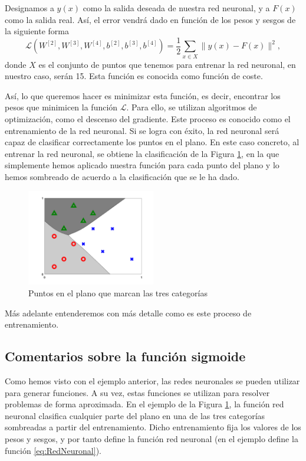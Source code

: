 \documentclass[a4paper,11pt,spanish, twoside, leqno]{tfg-uam}
\theoremstyle{definition}
\begin{document}
Designamos a $y(x)$ como la salida deseada de nuestra red neuronal, y a $F(x)$ como la salida real. Así, el error vendrá dado en función de los pesos y sesgos de la siguiente forma
\begin{equation*}
    \mathcal{L}(W^{[2]},W^{[3]},W^{[4]},b^{[2]},b^{[3]},b^{[4]})=\frac{1}{2}\sum_{x\in X}\|y(x)-F(x)\|^2,
\end{equation*}
donde $X$ es el conjunto de puntos que tenemos para entrenar la red neuronal, en nuestro caso, serán 15. Esta función es conocida como función de coste.

Así, lo que queremos hacer es minimizar esta función, es decir, encontrar los pesos que minimicen la función $\mathcal{L}$. Para ello, se utilizan algoritmos de optimización, como el descenso del gradiente. Este proceso es conocido como el entrenamiento de la red neuronal. Si se logra con éxito, la red neuronal será capaz de clasificar correctamente los puntos en el plano. En este caso concreto, al entrenar la red neuronal, se obtiene la clasificación de la Figura \ref{fig:ClasificacionFinal}, en la que simplemente hemos aplicado nuestra función para cada punto del plano y lo hemos sombreado de acuerdo a la clasificación que se le ha dado.

\begin{figure}
    \centering
    \includegraphics[width=0.5\textwidth]{Figuras/classifier_back.png}
    \caption{Puntos en el plano que marcan las tres categorías}
    \label{fig:ClasificacionFinal}
\end{figure}

Más adelante entenderemos con más detalle como es este proceso de entrenamiento.

\subsection{Comentarios sobre la función sigmoide}\label{subsec:Sigmoide}
Como hemos visto con el ejemplo anterior, las redes neuronales se pueden utilizar para generar funciones. A su vez, estas funciones se utilizan para resolver problemas de forma aproximada. En el ejemplo de la Figura \ref{fig:ClasificacionFinal}, la función red neuronal clasifica cualquier parte del plano en una de las tres categorías sombreadas a partir del entrenamiento. Dicho entrenamiento fija los valores de los pesos y sesgos, y por tanto define la función red neuronal (en el ejemplo define la función \eqref{eq:RedNeuronal}).
\end{document}

